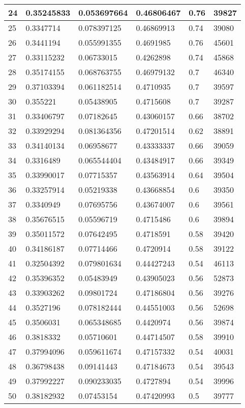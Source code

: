 \begin{longtable}{|l|l|l|l|l|l|}
24 & 0.35245833 & 0.053697664 & 0.46806467 & 0.76 & 39827 \\ \hline 
25 & 0.3347714 & 0.078397125 & 0.46869913 & 0.74 & 39080 \\ \hline 
26 & 0.3441194 & 0.055991355 & 0.4691985 & 0.76 & 45601 \\ \hline 
27 & 0.33115232 & 0.06733015 & 0.4262898 & 0.74 & 45868 \\ \hline 
28 & 0.35174155 & 0.068763755 & 0.46979132 & 0.7 & 46340 \\ \hline 
29 & 0.37103394 & 0.061182514 & 0.4710935 & 0.7 & 39597 \\ \hline 
30 & 0.355221 & 0.05438905 & 0.4715608 & 0.7 & 39287 \\ \hline 
31 & 0.33406797 & 0.07182645 & 0.43060157 & 0.66 & 38702 \\ \hline 
32 & 0.33929294 & 0.081364356 & 0.47201514 & 0.62 & 38891 \\ \hline 
33 & 0.34140134 & 0.06958677 & 0.43333337 & 0.66 & 39059 \\ \hline 
34 & 0.3316489 & 0.065544404 & 0.43484917 & 0.66 & 39349 \\ \hline 
35 & 0.33990017 & 0.07715357 & 0.43563914 & 0.64 & 39504 \\ \hline 
36 & 0.33257914 & 0.05219338 & 0.43668854 & 0.6 & 39350 \\ \hline 
37 & 0.3340949 & 0.07695756 & 0.43674007 & 0.6 & 39561 \\ \hline 
38 & 0.35676515 & 0.05596719 & 0.4715486 & 0.6 & 39894 \\ \hline 
39 & 0.35011572 & 0.07642495 & 0.4718591 & 0.58 & 39420 \\ \hline 
40 & 0.34186187 & 0.07714466 & 0.4720914 & 0.58 & 39122 \\ \hline 
41 & 0.32504392 & 0.079801634 & 0.44427243 & 0.54 & 46113 \\ \hline 
42 & 0.35396352 & 0.05483949 & 0.43905023 & 0.56 & 52873 \\ \hline 
43 & 0.33903262 & 0.09801724 & 0.47186804 & 0.56 & 39276 \\ \hline 
44 & 0.3527196 & 0.078182444 & 0.44551003 & 0.56 & 52698 \\ \hline 
45 & 0.3506031 & 0.065348685 & 0.4420974 & 0.56 & 39874 \\ \hline 
46 & 0.3818332 & 0.05710601 & 0.44714507 & 0.58 & 39910 \\ \hline 
47 & 0.37994096 & 0.059611674 & 0.47157332 & 0.54 & 40031 \\ \hline 
48 & 0.36798438 & 0.09141443 & 0.47184673 & 0.54 & 39543 \\ \hline 
49 & 0.37992227 & 0.090233035 & 0.4727894 & 0.54 & 39996 \\ \hline 
50 & 0.38182932 & 0.07453154 & 0.47420993 & 0.5 & 39777 \\ \hline 
\end{longtable}
